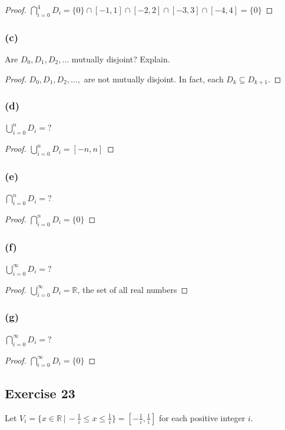 \documentclass[14pt]{extarticle}
\newcommand{\dps}{\displaystyle}
\newcommand{\R}{\mathbb{R}}
\begin{document}
\begin{proof}
\(\dps \bigcap_{i=0}^{4}D_i = \{0\} \cap [-1, 1] \cap [-2, 2] \cap [-3, 3] \cap [-4, 4] = \{0\}\)
\end{proof}

\subsubsection{(c)}
Are \(D_0, D_1, D_2, \ldots\) mutually disjoint? Explain.

\begin{proof}
$D_0, D_1, D_2, \ldots,$ are not mutually disjoint. In fact, each \(D_k \subseteq D_{k+1}\).
\end{proof}

\subsubsection{(d)}
\(\dps \bigcup_{i=0}^{n}D_i = ?\)

\begin{proof}
\(\dps \bigcup_{i=0}^{n}D_i = [-n, n]\)
\end{proof}

\subsubsection{(e)}
\(\dps \bigcap_{i=0}^{n}D_i = ?\)

\begin{proof}
\(\dps \bigcap_{i=0}^{n}D_i = \{0\}\)
\end{proof}

\subsubsection{(f)}
\(\dps \bigcup_{i=0}^{\infty}D_i = ?\)

\begin{proof}
\(\dps \bigcup_{i=0}^{\infty}D_i = \R\), the set of all real numbers
\end{proof}

\subsubsection{(g)}
\(\dps \bigcap_{i=0}^{\infty}D_i = ?\)

\begin{proof}
\(\dps \bigcap_{i=0}^{\infty}D_i = \{0\}\)
\end{proof}

\subsection{Exercise 23}
Let \(V_i = \{x \in \R \,|\, -\frac{1}{i} \leq x \leq \frac{1}{i}\} = [-\frac{1}{i}, \frac{1}{i}]\) 
for each positive integer $i$.
\end{document}
